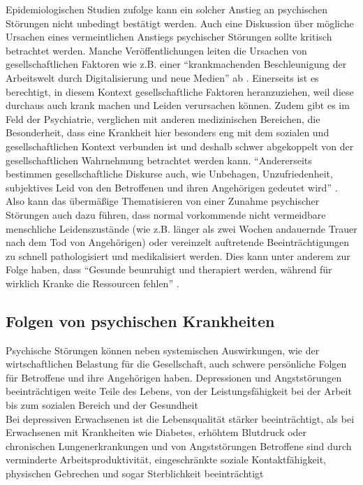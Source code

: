 Epidemiologischen Studien zufolge kann ein solcher Anstieg an psychischen Störungen nicht unbedingt bestätigt werden. 
Auch eine Diskussion über mögliche Ursachen eines vermeintlichen Anstiegs psychischer Störungen 
sollte kritisch betrachtet werden.
Manche Veröffentlichungen leiten die Ursachen von gesellschaftlichen Faktoren 
wie z.B. einer “krankmachenden Beschleunigung der Arbeitswelt durch Digitalisierung und neue Medien” ab 
\cite[S. 6]{wagner_psychische_2021}. %
Einerseits ist es berechtigt, in diesem Kontext gesellschaftliche Faktoren heranzuziehen, 
weil diese durchaus auch krank machen und Leiden verursachen können. 
Zudem gibt es im Feld der Psychiatrie, verglichen mit anderen medizinischen Bereichen, die Besonderheit, 
dass eine Krankheit hier besonders eng mit dem sozialen und gesellschaftlichen Kontext verbunden ist 
und deshalb schwer abgekoppelt von der gesellschaftlichen Wahrnehmung betrachtet werden kann. 
“Andererseits bestimmen gesellschaftliche Diskurse auch, 
wie Unbehagen, Unzufriedenheit, subjektives Leid von den Betroffenen 
und ihren Angehörigen gedeutet wird” \cite[S.6]{wagner_psychische_2021}.    \\ %
Also kann das übermäßige Thematisieren von einer Zunahme psychischer Störungen auch dazu führen, 
dass normal vorkommende nicht vermeidbare menschliche Leidenszustände 
(wie z.B. länger als zwei Wochen andauernde Trauer nach dem Tod von Angehörigen) 
oder vereinzelt auftretende Beeinträchtigungen zu schnell pathologisiert und medikalisiert werden. 
Dies kann unter anderem zur Folge haben, dass “Gesunde beunruhigt und therapiert werden, 
während für wirklich Kranke die Ressourcen fehlen” \cite[S.11]{wagner_psychische_2021}. %




\subsection{Folgen von psychischen Krankheiten}\label{subsubsec:folgen_psychischer_krankheiten}

Psychische Störungen können neben systemischen Auswirkungen, 
wie der wirtschaftlichen Belastung für die Gesellschaft, 
auch schwere persönliche Folgen für Betroffene und ihre Angehörigen haben. 
Depressionen und Angststörungen beeinträchtigen weite Teile des Lebens, 
von der Leistungsfähigkeit bei der Arbeit bis zum sozialen Bereich 
und der Gesundheit \cite[]{brenes_anxiety_2007}    \\ %
Bei depressiven Erwachsenen ist die Lebensqualität stärker beeinträchtigt, 
als bei Erwachsenen mit Krankheiten wie Diabetes, erhöhtem Blutdruck oder chronischen Lungenerkrankungen 
und von Angststörungen Betroffene sind durch verminderte Arbeitsproduktivität, 
eingeschränkte soziale Kontaktfähigkeit, physischen Gebrechen 
und sogar Sterblichkeit beeinträchtigt 
\cite[]{weisel_innovations_2021,brenes_anxiety_2007} %


